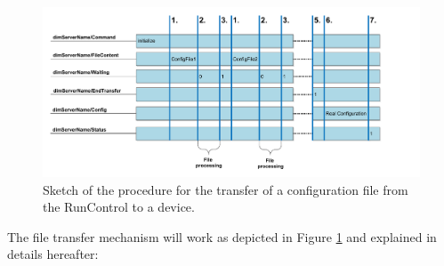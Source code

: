 \documentclass[a4paper]{article}
\begin{document}
\begin{figure}
	\center
	\includegraphics[width=\textwidth]{Doc/Configuration}
	\caption{Sketch of the procedure for the transfer of a configuration file from the RunControl to
	a device.}
	\label{fig:fileTransfer}
\end{figure}
The file transfer mechanism will work as depicted in Figure \ref{fig:fileTransfer} and explained in
details hereafter:
\end{document}
